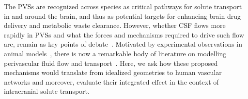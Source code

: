\documentclass[fleqn,10pt]{wlscirep}
\begin{document}
The PVSs are recognized across species as critical pathways for solute
transport in and around the brain, and thus as potential targets for
enhancing brain drug delivery and metabolic waste clearance. However,
whether CSF flows more rapidly in PVSs and what the forces and
mechanisms required to drive such flow are, remain as key points of
debate~\cite{bohr2022glymphatic, van2024caa}. Motivated by
experimental observations in animal
models~\cite{iliff2012paravascular, iliff2013cerebral, mestre2018flow,
  bedussi2018paravascular}, there is now a remarkable body of
literature on modelling perivascular fluid flow and
transport~\cite{bilston2003arterial, asgari2016glymphatic,
  rey2018pulsatile, daversin2020mechanisms, sharp2019dispersion,
  thomas2019fluid, kedarasetti2020functional, kedarasetti2020arterial,
  troyetsky2021dispersion, martinac2021phase, gjerde2023directional,
  nozaleda2024arterial}. Here, we ask how these proposed mechanisms
would translate from idealized geometries to human vascular networks
and moreover, evaluate their integrated effect in the context of
intracranial solute transport.
\end{document}
